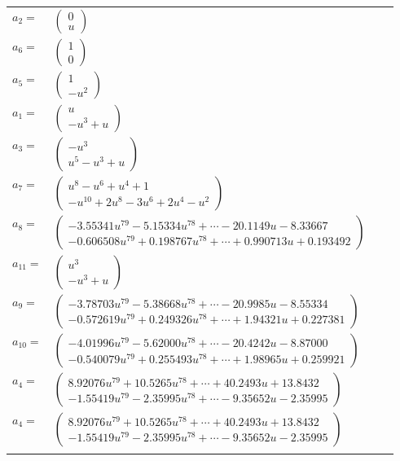 \documentclass[1p]{elsarticle_modified}
\theoremstyle{definition}
\begin{document}
\begin{tabular}{m{7pt} m{180pt} m{7pt} m{180pt} }
\flushright $a_{2}=$&$\begin{pmatrix}0\\u\end{pmatrix}$ \\
\flushright $a_{6}=$&$\begin{pmatrix}1\\0\end{pmatrix}$ \\
\flushright $a_{5}=$&$\begin{pmatrix}1\\- u^2\end{pmatrix}$ \\
\flushright $a_{1}=$&$\begin{pmatrix}u\\- u^3+u\end{pmatrix}$ \\
\flushright $a_{3}=$&$\begin{pmatrix}- u^3\\u^5- u^3+u\end{pmatrix}$ \\
\flushright $a_{7}=$&$\begin{pmatrix}u^8- u^6+u^4+1\\- u^{10}+2 u^8-3 u^6+2 u^4- u^2\end{pmatrix}$ \\
\flushright $a_{8}=$&$\begin{pmatrix}-3.55341 u^{79}-5.15334 u^{78}+\cdots-20.1149 u-8.33667\\-0.606508 u^{79}+0.198767 u^{78}+\cdots+0.990713 u+0.193492\end{pmatrix}$ \\
\flushright $a_{11}=$&$\begin{pmatrix}u^3\\- u^3+u\end{pmatrix}$ \\
\flushright $a_{9}=$&$\begin{pmatrix}-3.78703 u^{79}-5.38668 u^{78}+\cdots-20.9985 u-8.55334\\-0.572619 u^{79}+0.249326 u^{78}+\cdots+1.94321 u+0.227381\end{pmatrix}$ \\
\flushright $a_{10}=$&$\begin{pmatrix}-4.01996 u^{79}-5.62000 u^{78}+\cdots-20.4242 u-8.87000\\-0.540079 u^{79}+0.255493 u^{78}+\cdots+1.98965 u+0.259921\end{pmatrix}$ \\
\flushright $a_{4}=$&$\begin{pmatrix}8.92076 u^{79}+10.5265 u^{78}+\cdots+40.2493 u+13.8432\\-1.55419 u^{79}-2.35995 u^{78}+\cdots-9.35652 u-2.35995\end{pmatrix}$\\ \flushright $a_{4}=$&$\begin{pmatrix}8.92076 u^{79}+10.5265 u^{78}+\cdots+40.2493 u+13.8432\\-1.55419 u^{79}-2.35995 u^{78}+\cdots-9.35652 u-2.35995\end{pmatrix}$\\&\end{tabular}
\end{document}
